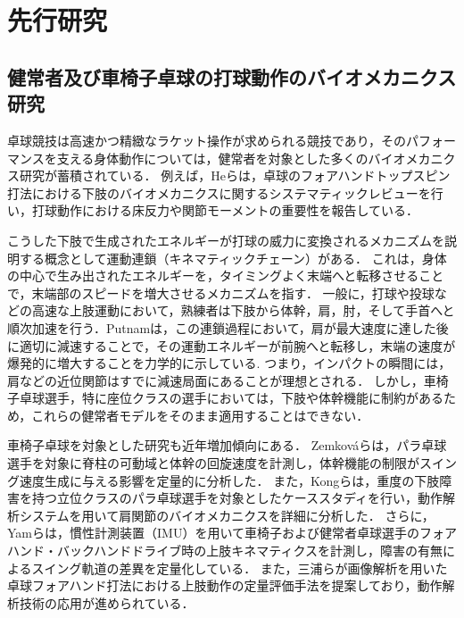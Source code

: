 \documentclass[../main]{subfiles}
\begin{document}
\section{先行研究}
\label{sec:intro_previous-research}

\subsection{健常者及び車椅子卓球の打球動作のバイオメカニクス研究}
\label{sec:intro_previous-research_1}

卓球競技は高速かつ精緻なラケット操作が求められる競技であり，そのパフォーマンスを支える身体動作については，健常者を対象とした多くのバイオメカニクス研究が蓄積されている．
例えば，Heらは，卓球のフォアハンドトップスピン打法における下肢のバイオメカニクスに関するシステマティックレビューを行い，打球動作における床反力や関節モーメントの重要性を報告している．

こうした下肢で生成されたエネルギーが打球の威力に変換されるメカニズムを説明する概念として運動連鎖（キネマティックチェーン）がある．
これは，身体の中心で生み出されたエネルギーを，タイミングよく末端へと転移させることで，末端部のスピードを増大させるメカニズムを指す．
一般に，打球や投球などの高速な上肢運動において，熟練者は下肢から体幹，肩，肘，そして手首へと順次加速を行う．Putnamは，この連鎖過程において，肩が最大速度に達した後に適切に減速することで，その運動エネルギーが前腕へと転移し，末端の速度が爆発的に増大することを力学的に示している.
つまり，インパクトの瞬間には，肩などの近位関節はすでに減速局面にあることが理想とされる．
しかし，車椅子卓球選手，特に座位クラスの選手においては，下肢や体幹機能に制約があるため，これらの健常者モデルをそのまま適用することはできない．

車椅子卓球を対象とした研究も近年増加傾向にある．
Zemkováらは，パラ卓球選手を対象に脊柱の可動域と体幹の回旋速度を計測し，体幹機能の制限がスイング速度生成に与える影響を定量的に分析した．
また，Kongらは，重度の下肢障害を持つ立位クラスのパラ卓球選手を対象としたケーススタディを行い，動作解析システムを用いて肩関節のバイオメカニクスを詳細に分析した．
さらに，Yamらは，慣性計測装置（IMU）を用いて車椅子および健常者卓球選手のフォアハンド・バックハンドドライブ時の上肢キネマティクスを計測し，障害の有無によるスイング軌道の差異を定量化している．
また，三浦らが画像解析を用いた卓球フォアハンド打法における上肢動作の定量評価手法を提案しており，動作解析技術の応用が進められている．
\end{document}
